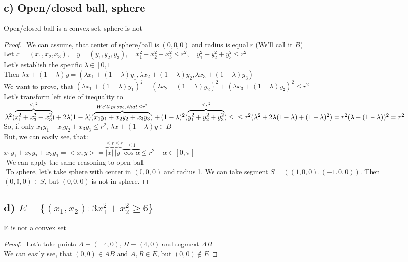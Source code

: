 \documentclass[12pt]{article}
\begin{document}
\subsection*{c) Open/closed ball, sphere}
Open/closed ball is a convex set, sphere is not
\begin{proof}
    $ $\newline
    We can assume, that center of sphere/ball is \((0,0,0)\) and radius is equal \(r\) (We'll call it \(B\))\\
    Let \(x=(x_1, x_2, x_3),\quad y=(y_1, y_2, y_3),\quad x_1^2+x_2^2+x_3^2\leq r^2,\quad y_1^2+y_2^2+y_3^2\leq r^2\)\\
    Let's establish the specific \(\lambda \in [0,1]\)\\
    Then \(\lambda x+(1-\lambda)y=(\lambda x_1+(1-\lambda)y_1, \lambda x_2+(1-\lambda)y_2, \lambda x_3+(1-\lambda)y_3)\)\\
    We want to prove, that \( (\lambda x_1+(1-\lambda)y_1)^2+ (\lambda x_2+(1-\lambda)y_2)^2+ (\lambda x_3+(1-\lambda)y_3)^2\leq r^2 \)\\
    Let's transform left side of inequality to:\\ \( \lambda^2(\overbrace{x_1^2+x^2_2+x_3^2}^{\leq r^2})+2\lambda(1-\lambda)(\overbrace{x_1 y_1+x_2 y_2+x_3 y_3}^{We'll\,prove, \,that\,\leq r^2})+(1-\lambda)^2(\overbrace{y_1^2+y^2_2+y_3^2}^{\leq r^2})\leq \\ \leq r^2 (\lambda^2+2\lambda(1-\lambda)+(1-\lambda)^2) =r^2(\lambda+(1-\lambda))^2=r^2\)\\
    So, if only \(x_1 y_1+x_2 y_2+x_3 y_3\leq r^2,\,\lambda x+(1-\lambda)y \in B\)\\
    But, we can easily see, that:\\ \(x_1 y_1+x_2 y_2+x_3 y_3=<x, y>=\overbrace{|x|}^{\leq r}\overbrace{|y|}^{\leq r}\overbrace{\cos{\alpha}}^{\leq 1}\leq r^2 \quad\,\alpha \in [0,\pi]\)\\
    $ $\newline
    We can apply the same reasoning to open ball\\
    $ $\newline
    To sphere, let's take sphere with center in \((0,0,0)\) and radius 1. We can take segment \( S=((1, 0, 0), (-1, 0, 0))\). Then \((0,0,0) \in S\), but \((0,0,0)\) is not in sphere.
\end{proof}
\subsection*{d) \( E=\{ (x_1, x_2):3x_1^2+x_2^2 \geq 6 \}\)}
E is not a convex set
\begin{proof}
    $ $\newline
    Let's take points \(A=(-4,0), \, B=(4,0)\) and segment \(AB\)\\
    We can easily see, that \((0,0) \in AB\) and \( A, B \in E\), but \( (0,0)\notin E\)
\end{proof}
\end{document}
